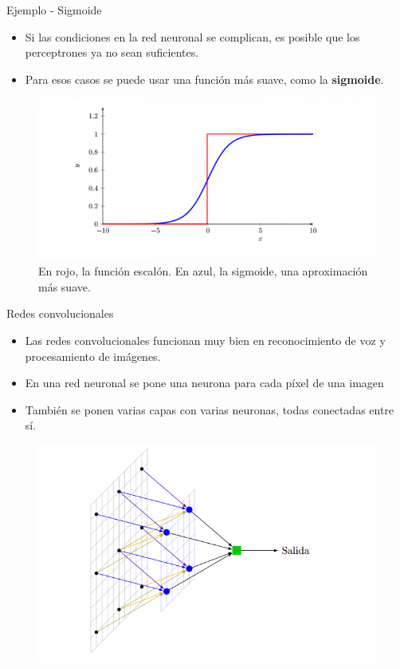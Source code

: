 \documentclass[11pt,aspectratio=169]{beamer}
\begin{document}
\begin{frame}{Ejemplo - Sigmoide}
	\begin{itemize}
		\item Si las condiciones en la red neuronal se complican, es posible que los perceptrones ya no sean 
			suficientes.\pause
		\item Para esos casos se puede usar una función más suave, como la \textbf{sigmoide}.\pause
	\end{itemize}
	\begin{figure}
		\centering
		\includegraphics[scale=0.6]{img/rn04.png}
		\caption[short]{En rojo, la función escalón. En azul, la sigmoide, una aproximación más suave.}
	\end{figure}
\end{frame}

\begin{frame}{Redes convolucionales}
	\begin{itemize}
		\item Las redes convolucionales funcionan muy bien en reconocimiento de voz y procesamiento de imágenes. \pause
		\item En una red neuronal se pone una neurona para cada píxel de una imagen\pause 
		\item También se ponen varias capas con varias neuronas, todas conectadas entre sí. \pause
	\end{itemize}
	\begin{figure}
		\centering
		\includegraphics[scale=0.5]{img/rn05.png}
	\end{figure}
\end{frame}
\end{document}
